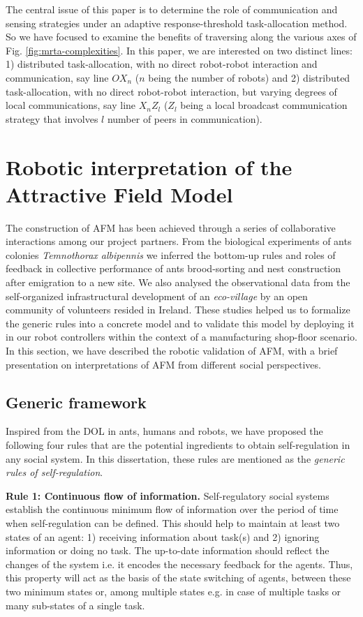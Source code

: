 \documentclass[final,5p,times,twocolumn]{elsarticle}
\begin{document}
The central issue of this paper is to determine the role of communication and sensing strategies under an adaptive response-threshold task-allocation method. So we have focused to examine the benefits of traversing along the various axes of Fig. \ref{fig:mrta-complexities}. In this paper, we are interested on two distinct lines: 1) distributed task-allocation, with no direct robot-robot interaction and communication, say line $OX_{n}$ ($n$ being the number of robots)  and 2) distributed task-allocation, with no direct robot-robot interaction, but varying degrees of local communications, say line $X_{n}Z_{l}$  ($Z_{l}$ being a local broadcast communication strategy that involves $l$ number of peers in communication).
\section{Robotic interpretation of the Attractive Field Model}
\label{sec:afm}
The construction of AFM has been achieved through a series of collaborative interactions among our project partners. From the biological experiments of ants colonies {\em Temnothorax albipennis} we  inferred the bottom-up rules and roles of feedback in collective performance of ants brood-sorting and nest construction after emigration to a new site. We  also analysed the observational data from the self-organized infrastructural development of an {\em eco-village} by an open community of volunteers resided in Ireland. These studies helped us to formalize the generic rules into a concrete model  and to validate this model by deploying it in our robot controllers within the context of a manufacturing shop-floor scenario. In this section, we have described the robotic validation of AFM, with a brief presentation on interpretations of AFM from different social perspectives.
\subsection{Generic framework}
\label{afm:framework}
Inspired from the DOL in ants, humans and robots,  we  have proposed the following four rules that are the potential ingredients to obtain self-regulation in any social system. In this dissertation, these rules are mentioned as the {\em generic rules of self-regulation}.

\textbf{Rule 1: Continuous flow of information.} Self-regulatory social systems establish the continuous minimum flow of information over the period of time when self-regulation can be defined. This should help to maintain at least two states of an agent: 1) receiving information about task(s) and 2) ignoring information or doing no task. The up-to-date information should reflect  the changes of the system i.e. it encodes the necessary feedback for the agents. Thus, this property will act as the basis of the state switching of agents, between these two minimum states or, among multiple states e.g. in case of multiple tasks or many sub-states of a single task.
\end{document}
